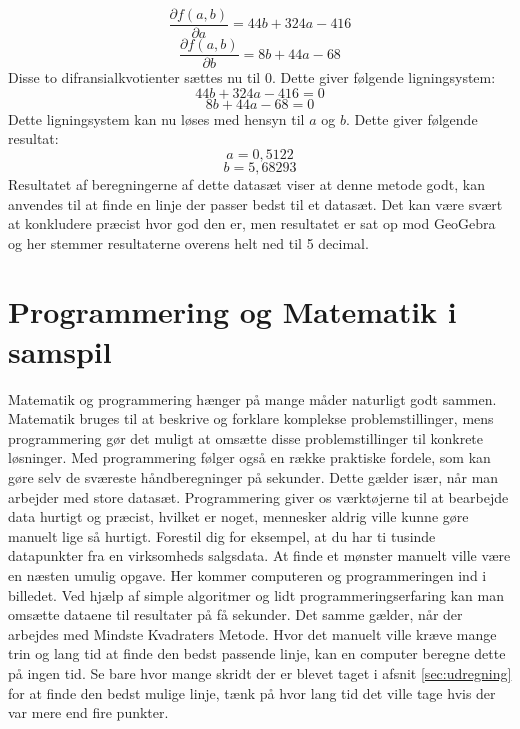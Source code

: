 \begin{equation*}
    \frac{\partial f(a,b)}{\partial a} = 44b + 324a - 416
\end{equation*}
\begin{equation*}
    \frac{\partial f(a,b)}{\partial b} = 8b + 44a - 68
\end{equation*}
Disse to difransialkvotienter sættes nu til 0. Dette giver følgende ligningsystem:
\begin{equation*}
    44b + 324a - 416 = 0
\end{equation*}
\begin{equation*}
    8b + 44a - 68 = 0
\end{equation*}
Dette ligningsystem kan nu løses med hensyn til $a$ og $b$. Dette giver følgende resultat:
\begin{equation*}
    a = 0,5122 
\end{equation*}
\begin{equation*}
    b = 5,68293
\end{equation*}
Resultatet af beregningerne af dette datasæt viser at denne metode godt, kan anvendes til at finde en linje der passer bedst til et datasæt. Det kan være svært at konkludere præcist hvor god den er, men resultatet er sat op mod GeoGebra og her stemmer resultaterne overens helt ned til 5 decimal.

\section{Programmering og Matematik i samspil}
Matematik og programmering hænger på mange måder naturligt godt sammen. Matematik bruges til at beskrive og forklare komplekse problemstillinger, mens programmering gør det muligt at omsætte disse problemstillinger til konkrete løsninger. Med programmering følger også en række praktiske fordele, som kan gøre selv de sværeste håndberegninger på sekunder. Dette gælder især, når man arbejder med store datasæt. Programmering giver os værktøjerne til at bearbejde data hurtigt og præcist, hvilket er noget, mennesker aldrig ville kunne gøre manuelt lige så hurtigt. \cite{codeWithC} Forestil dig for eksempel, at du har ti tusinde datapunkter fra en virksomheds salgsdata. At finde et mønster manuelt ville være en næsten umulig opgave. Her kommer computeren og programmeringen ind i billedet. Ved hjælp af simple algoritmer og lidt programmeringserfaring kan man omsætte dataene til resultater på få sekunder. Det samme gælder, når der arbejdes med Mindste Kvadraters Metode. Hvor det manuelt ville kræve mange trin og lang tid at finde den bedst passende linje, kan en computer beregne dette på ingen tid. Se bare hvor mange skridt der er blevet taget i afsnit \ref{sec:udregning} for at finde den bedst mulige linje, tænk på hvor lang tid det ville tage hvis der var mere end fire punkter. 

